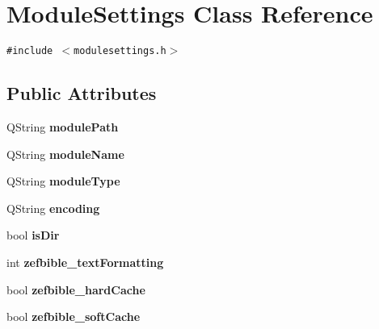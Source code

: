 \hypertarget{classModuleSettings}{
\section{ModuleSettings Class Reference}
\label{classModuleSettings}
}
{\tt \#include $<$modulesettings.h$>$}

\subsection*{Public Attributes}
\begin{CompactItemize}
\item 
\hypertarget{classModuleSettings_a408aa93b659f03f91d66e742c56c39c}{
QString \textbf{modulePath}}
\label{classModuleSettings_a408aa93b659f03f91d66e742c56c39c}

\item 
\hypertarget{classModuleSettings_cf1a856fdf42a2ceee420d478a272256}{
QString \textbf{moduleName}}
\label{classModuleSettings_cf1a856fdf42a2ceee420d478a272256}

\item 
\hypertarget{classModuleSettings_a5aa01e89cd61f4b19134b0d5d372034}{
QString \textbf{moduleType}}
\label{classModuleSettings_a5aa01e89cd61f4b19134b0d5d372034}

\item 
\hypertarget{classModuleSettings_0c0bb115443c382e54e406aa1a0ecce2}{
QString \textbf{encoding}}
\label{classModuleSettings_0c0bb115443c382e54e406aa1a0ecce2}

\item 
\hypertarget{classModuleSettings_8609fa8d6e05485f136ede4b7497d393}{
bool \textbf{isDir}}
\label{classModuleSettings_8609fa8d6e05485f136ede4b7497d393}

\item 
\hypertarget{classModuleSettings_e48c0b3d62cf6e20b6ecf6d2c9df46bb}{
int \textbf{zefbible\_\-textFormatting}}
\label{classModuleSettings_e48c0b3d62cf6e20b6ecf6d2c9df46bb}

\item 
\hypertarget{classModuleSettings_3a2e80afc1f966db21ef5fb326dbdf7f}{
bool \textbf{zefbible\_\-hardCache}}
\label{classModuleSettings_3a2e80afc1f966db21ef5fb326dbdf7f}

\item 
\hypertarget{classModuleSettings_457dcb021bbe45a905fd66e0e92c9435}{
bool \textbf{zefbible\_\-softCache}}
\label{classModuleSettings_457dcb021bbe45a905fd66e0e92c9435}


\end{CompactItemize}
